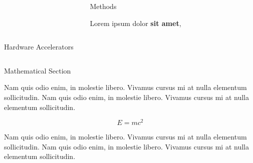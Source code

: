 \documentclass[final]{beamer}
\newlength{\onecolwid}
\newlength{\twocolwid}
\begin{document}
\begin{frame}[t]
\begin{columns}[t]
\begin{column}{\twocolwid}
\begin{columns}[t,totalwidth=\twocolwid]
\begin{column}{\onecolwid}
\end{column} %

\begin{column}{\onecolwid}\vspace{-.6in} %


\begin{block}{Methods}

Lorem ipsum dolor \textbf{sit amet}, 

\end{block}
\end{column} %
\end{columns} %


\begin{alertblock}{Hardware Accelerators}

\end{alertblock} 


\begin{columns}[t,totalwidth=\twocolwid] %
\begin{column}{\onecolwid} %


\begin{block}{Mathematical Section}

Nam quis odio enim, in molestie libero. Vivamus cursus mi at nulla elementum sollicitudin. Nam quis odio enim, in molestie libero. Vivamus cursus mi at nulla elementum sollicitudin.
  
\begin{equation}
E = mc^{2}
\label{eqn:Einstein}
\end{equation}

Nam quis odio enim, in molestie libero. Vivamus cursus mi at nulla elementum sollicitudin. Nam quis odio enim, in molestie libero. Vivamus cursus mi at nulla elementum sollicitudin.


\end{block}
\end{column}
\end{columns}
\end{column}
\end{columns}
\end{frame}
\end{document}
